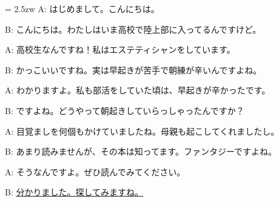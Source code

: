 \documentclass[11pt]{amsart}
\title{}
\author{}
\newenvironment{hangall}[1]{\hangindent = 2.5zw\everypar{\hangindent = 2.5zw}}{}
\begin{document}
\maketitle
\begin{hangall}{}%
A: はじめまして。こんにちは。

B: こんにちは。わたしはいま高校で陸上部に入ってるんですけど。

A: 高校生なんですね！私はエステティシャンをしています。

B: かっこいいですね。実は早起きが苦手で朝練が辛いんですよね。

A: わかりますよ。私も部活をしていた頃は、早起きが辛かったです。

B: ですよね。どうやって朝起きしていらっしゃったんですか？

A: 目覚ましを何個もかけていましたね。母親も起こしてくれましたし。

B: あまり読みませんが、その本は知ってます。ファンタジーですよね。

A: そうなんですよ。ぜひ読んでみてください。

B: \ul{分かりました。探してみますね。}\end{hangall}
\end{document}
